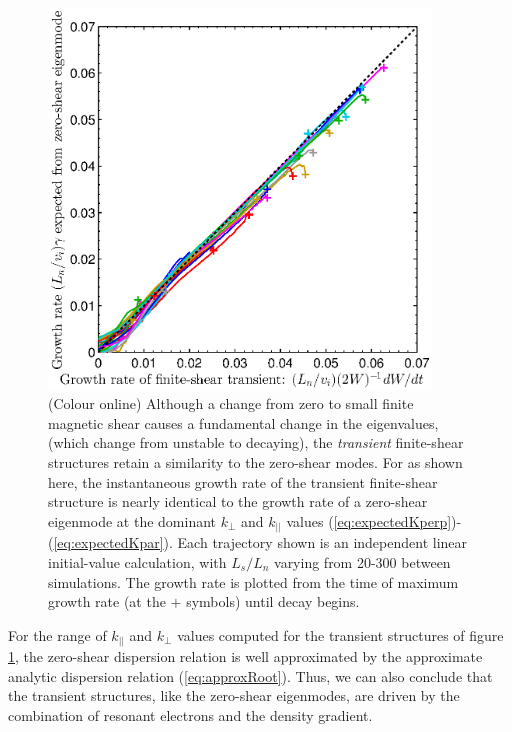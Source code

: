 \documentclass{jpp}
\begin{document}
\begin{figure}
%
%
\centerline{\includegraphics[width=4in]{fig3.eps}}
\caption{(Colour online)
Although a change from zero to small finite magnetic shear causes a fundamental change in the eigenvalues,
(which change from unstable to decaying),
the \emph{transient} finite-shear structures retain a similarity to the zero-shear modes.  For as shown here,
the instantaneous growth rate of the transient finite-shear structure is nearly identical
to the growth rate of a zero-shear eigenmode at the dominant $k_{\perp}$ and $k_{||}$ values
(\ref{eq:expectedKperp})-(\ref{eq:expectedKpar}).  Each trajectory shown is an independent
linear initial-value calculation, with $L_s/L_n$ varying from 20-300 between simulations.  The growth rate is plotted from
the time of maximum growth rate (at the $+$ symbols) until decay begins.
\label{fig:comparingTransientTo0Shear}}
\end{figure}



For the range of $k_{||}$ and $k_{\perp}$ values computed for the transient structures
of figure \ref{fig:comparingTransientTo0Shear}, the zero-shear dispersion relation
is well approximated by the approximate analytic dispersion relation (\ref{eq:approxRoot}).  Thus, we can also conclude
that the transient structures, like the zero-shear eigenmodes,
are driven by the combination of resonant electrons and the density gradient.
\end{document}
